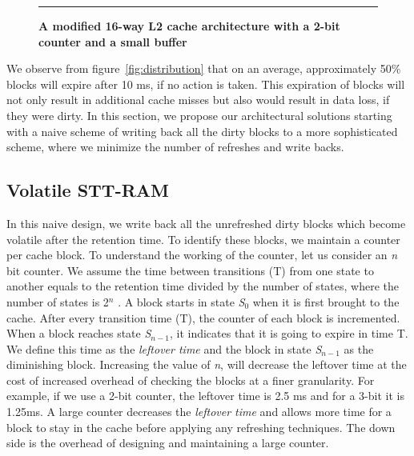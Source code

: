 
\begin{figure*} [t]
\center
 \hrule
 \caption{\label{fig:architecture} \scriptsize \bf A modified 16-way L2 cache architecture with a 2-bit counter and a small buffer}
\end{figure*}


We observe from figure~\ref{fig:distribution} that on an average, approximately 50\% blocks will
expire after 10 ms, if no action is taken. This expiration of blocks will not only result in additional cache misses
but also would
result in data loss, if they were dirty. In this section, we propose our architectural solutions starting with
a naive scheme of writing back
all the dirty blocks to a more sophisticated scheme, where we minimize the number of refreshes and write backs.

\subsection{{Volatile STT-RAM}}
In this naive design, we write back all the unrefreshed dirty blocks which become volatile after the retention time.
To identify these blocks,
we maintain a counter per cache block.  To understand the working of the counter, let us consider an {\it n} bit
counter. We assume the time between transitions (T) from one state to another equals to the retention time
divided by the number of states, where the number of states is 2$^n$ .
A block starts in state {\it S$_0$} when it is first brought to the cache. After every transition time (T),
the counter of each block is incremented.
When a block reaches  state {\it S$_{n-1}$}, it indicates that it is going to expire in time T.
We define this time as the {\it leftover time} and the block in state {\it S$_{n-1}$} as  the diminishing block.
Increasing the value of {\it n}, will decrease the leftover time at the cost of increased overhead of checking
the blocks at a finer granularity.
For example, if we use a 2-bit counter, the leftover time is 2.5 ms and for a 3-bit it is 1.25ms.
A large counter decreases the {\it leftover time} and allows more time for a block to stay in the cache
before applying any refreshing techniques. The down side is the overhead of designing and maintaining a large counter.

